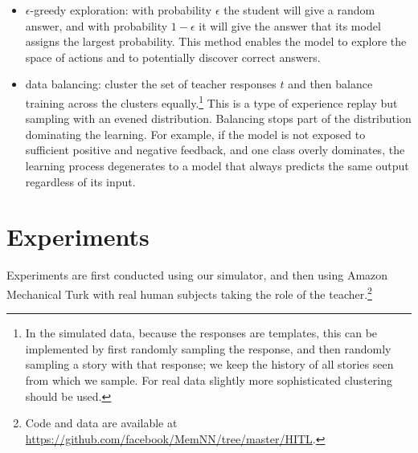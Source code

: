 \begin{itemize}
\item $\epsilon$-greedy exploration:  with probability $\epsilon$
the student will give a random answer, and with probability $1-\epsilon$ it
will give the answer that its model assigns the largest probability. This method enables the model to explore the space of actions and to potentially discover correct answers.
\item data balancing: cluster the set of teacher responses $t$ and then balance training across the clusters equally.\footnote{In the simulated data, because the responses are templates, this can be implemented by first randomly sampling the response, and then randomly sampling a story with that response; we keep the history of all stories seen from which we sample. For real data slightly more sophisticated clustering should be used.}
This is a type of experience replay \citep{mnih2013playing} but sampling with an evened distribution.
Balancing stops part of the distribution dominating the learning.
For example, if the  model is not exposed to sufficient positive and negative feedback,
and one class overly dominates, the learning process degenerates
to a model that always predicts the same output regardless of its input.


\end{itemize}





\section{Experiments}

Experiments are first conducted using our simulator, and then
using Amazon Mechanical Turk with real human subjects taking the role of the teacher.\footnote{
Code and data are available at
\tiny{\url{https://github.com/facebook/MemNN/tree/master/HITL}}.
}

